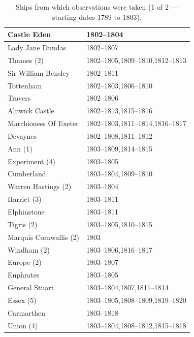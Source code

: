 \documentclass[CP]{copernicus}
\begin{document}
\begin{table}[!hbp]
\begin{minipage}[b]{0.5\linewidth}
{\begin{tabular}{|p{3.5cm}|p{3.5cm}|}
\hline
Castle Eden & 1802--1804\\
\hline
Lady Jane Dundas & 1802--1807\\
\hline
Thames (2) & 1802--1805,1809--1810,1812--1813\\
\hline
Sir William Bensley & 1802--1811\\
\hline
Tottenham & 1802--1803,1806--1810\\
\hline
Travers & 1802--1806\\
\hline
Alnwick Castle & 1802--1813,1815--1816\\
\hline
Marchioness Of Exeter & 1802--1803,1811--1814,1816--1817\\
\hline
Devaynes & 1802--1808,1811--1812\\
\hline
Ann (1) & 1803--1809,1814--1815\\
\hline
Experiment (4) & 1803--1805\\
\hline
Cumberland & 1803--1804,1809--1810\\
\hline
Warren Hastings (2) & 1803--1804\\
\hline
Harriet (3) & 1803--1811\\
\hline
Elphinstone & 1803--1811\\
\hline
Tigris (2) & 1803--1805,1810--1815\\
\hline
Marquis Cornwallis (2) & 1803\\
\hline
Windham (2) & 1803--1806,1816--1817\\
\hline
Europe (2) & 1803--1807\\
\hline
Euphrates & 1803--1805\\
\hline
General Stuart & 1803--1804,1807,1811--1814\\
\hline
Essex (5) & 1803--1805,1808--1809,1819--1820\\
\hline
Carmarthen & 1803--1818\\
\hline
Union (4) & 1803--1804,1808--1812,1815--1818\\
\hline
\end{tabular}
}
\end{minipage}
\vspace{0.5cm}
\caption{Ships from which observations were taken (1 of 2 --- starting dates 1789 to 1803).}
\label{T1.1}
\end{table}
\end{document}
